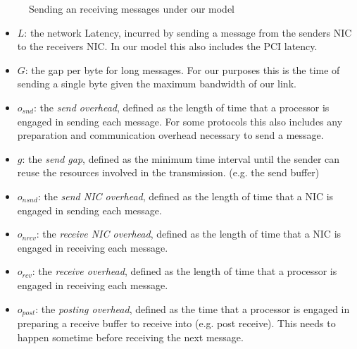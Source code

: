 \begin{figure}[!htp]
\begin{center}
\end{center}
\caption{Sending an receiving messages under our model}
\label{fig:model-base}
\end{figure}




\begin{itemize}
  \item $L$: the network Latency, incurred by sending a message from the senders NIC to the receivers NIC. In our model 
    this also includes the PCI latency.
  \item $G$: the gap per byte for long messages. For our purposes this is the time of sending a single byte given the 
    maximum bandwidth of our link.
  \item $o_{snd}$: the \emph{send overhead}, defined as the length of time that a processor is engaged in sending each message.
    For some protocols this also includes any preparation and communication overhead necessary to send a message.
  \item $g$: the \emph{send gap}, defined as the minimum time interval until the sender can reuse the resources involved in 
    the transmission. (e.g. the send buffer) 
  \item $o_{nsnd}$: the \emph{send NIC overhead}, defined as the length of time that a NIC is engaged in sending each message.
  \item $o_{nrcv}$: the \emph{receive NIC overhead}, defined as the length of time that a NIC is engaged in receiving each message.
  \item $o_{rcv}$: the \emph{receive overhead}, defined as the length of time that a processor is engaged in receiving each message.
  \item $o_{post}$: the \emph{posting overhead}, defined as the time that a processor is engaged in preparing a receive buffer
    to receive into (e.g. post receive). This needs to happen sometime before receiving the next message.
\end{itemize}

